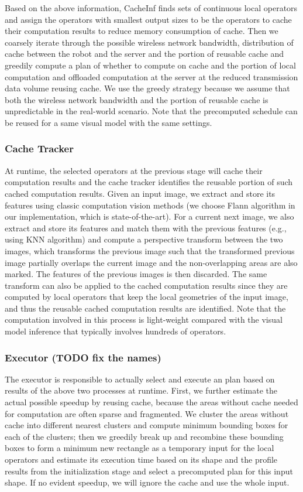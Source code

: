 Based on the above information, CacheInf finds sets of continuous local operators and assign the operators with smallest output sizes to be the operators to cache their computation results to reduce memory consumption of cache.
Then we coarsely iterate through the possible wireless network bandwidth, distribution of cache between the robot and the server and the portion of reusable cache and greedily compute a plan of whether to compute on cache and the portion of local computation and offloaded computation at the server at the reduced transmission data volume reusing cache.
We use the greedy strategy because we assume that both the wireless network bandwidth and the portion of reusable cache is unpredictable in the real-world scenario.
Note that the precomputed schedule can be reused for a same visual model with the same settings. 

\subsubsection{Cache Tracker}
At runtime, the selected operators at the previous stage will cache their computation results and the cache tracker identifies the reusable portion of such cached computation results.
Given an input image, we extract and store its features using classic computation vision methods (we choose Flann algorithm in our implementation, which is state-of-the-art).
For a current next image, we also extract and store its features and match them with the previous features (e.g., using KNN algorithm) and compute a perspective transform between the two images, which transforms the previous image such that the transformed previous image partially overlaps the current image and the non-overlapping areas are also marked.
The features of the previous images is then discarded.
The same transform can also be applied to the cached computation results since they are computed by local operators that keep the local geometries of the input image, and thus the reusable cached computation results are identified.
Note that the computation involved in this process is light-weight compared with the visual model inference that typically involves hundreds of operators.

\subsubsection{Executor (TODO fix the names)}
The executor is responsible to actually select and execute an plan based on results of the above two processes at runtime.
First, we further estimate the actual possible speedup by reusing cache, because the areas without cache needed for computation are often sparse and fragmented.
We cluster the areas without cache into different nearest clusters and compute minimum bounding boxes for each of the clusters;
then we greedily break up and recombine these bounding boxes to form a minimum new rectangle as a temporary input for the local operators and estimate its execution time based on its shape and the profile results from the initialization stage and select a precomputed plan for this input shape.
If no evident speedup, we will ignore the cache and use the whole input.

